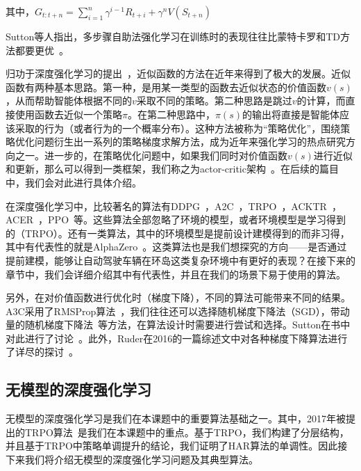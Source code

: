       \par 其中，$G_{t:t+n} = \sum_{i = 1}^{n}\gamma^{i-1}R_{t+i} + \gamma^n V(S_{t+n})$
      \par Sutton等人指出，多步骤自助法强化学习在训练时的表现往往比蒙特卡罗和TD方法都要更优~\cite{Sutton_book}。
      \par 归功于深度强化学习的提出~\cite{atari_2013, deepRL_overview}，近似函数的方法在近年来得到了极大的发展。近似函数有两种基本思路。第一种，是用某一类型的函数去近似状态的价值函数$v(s)$，从而帮助智能体根据不同的$v$采取不同的策略。第二种思路是跳过$v$的计算，而直接使用函数去近似一个策略$\pi$。在第二种思路中，$\pi(s)$的输出将直接是智能体应该采取的行为（或者行为的一个概率分布）。这种方法被称为``策略优化''，围绕策略优化问题衍生出一系列的策略梯度求解方法，成为近年来强化学习的热点研究方向之一。进一步的，在策略优化问题中，如果我们同时对价值函数$v(s)$进行近似和更新，那么可以得到一类框架，我们称之为actor-critic架构~\cite{Sutton_book}。在后续的篇目中，我们会对此进行具体介绍。\par
      在深度强化学习中，比较著名的算法有DDPG~\cite{DDPG}，A2C~\cite{A3C}，TRPO~\cite{TRPO}，ACKTR~\cite{ACKTR}，ACER~\cite{ACER}，PPO~\cite{PPO}等。这些算法全部忽略了环境的模型，或者环境模型是学习得到的（TRPO）。还有一类算法，其中的环境模型是提前设计建模得到的而非习得，其中有代表性的就是AlphaZero~\cite{AlphaZero}。这类算法也是我们想探究的方向——是否通过提前建模，能够让自动驾驶车辆在环岛这类复杂环境中有更好的表现？在接下来的章节中，我们会详细介绍其中有代表性，并且在我们的场景下易于使用的算法。\par
      另外，在对价值函数进行优化时（梯度下降），不同的算法可能带来不同的结果。A3C采用了RMSProp算法~\cite{RMSProp}，我们往往还可以选择随机梯度下降法（SGD），带动量的随机梯度下降法~\cite{SGD_momentum}等方法，在算法设计时需要进行尝试和选择。Sutton在书中对此进行了讨论~\cite{Sutton_book}。此外，Ruder在2016的一篇综述文中对各种梯度下降算法进行了详尽的探讨~\cite{GD_overview}。
      
    \subsection{无模型的深度强化学习}
      无模型的深度强化学习是我们在本课题中的重要算法基础之一。其中，2017年被提出的TRPO算法~\cite{TRPO}是我们在本课题中的重点。基于TRPO，我们构建了分层结构，并且基于TRPO中策略单调提升的结论，我们证明了HAR算法的单调性。因此接下来我们将介绍无模型的深度强化学习问题及其典型算法。
      
